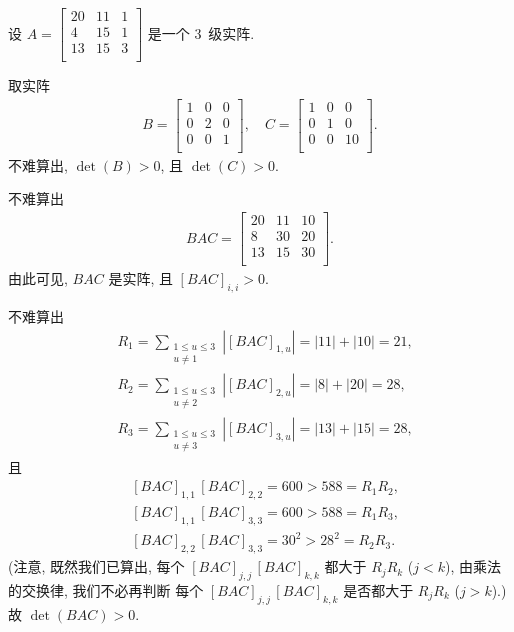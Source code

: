 \documentclass[../libro.tex]{subfiles}
\begin{document}
\begin{example}[continues=emp:NonzeroDet2]
    设 \(A =
        \begin{bmatrix}
            20 & 11 & 1 \\
            4  & 15 & 1 \\
            13 & 15 & 3 \\
    \end{bmatrix}\)
    是一个 \(3\)~级实阵.

    取实阵
    \begin{align*}
        B =
        \begin{bmatrix}
            1 & 0 & 0 \\
            0 & 2 & 0 \\
            0 & 0 & 1 \\
        \end{bmatrix},
        \quad
        C =
        \begin{bmatrix}
            1 & 0 & 0  \\
            0 & 1 & 0  \\
            0 & 0 & 10 \\
        \end{bmatrix}.
    \end{align*}
    不难算出, \(\det {(B)} > 0\),
    且 \(\det {(C)} > 0\).

    不难算出
    \begin{align*}
        BAC =
        \begin{bmatrix}
            20 & 11 & 10 \\
            8  & 30 & 20 \\
            13 & 15 & 30 \\
        \end{bmatrix}.
    \end{align*}
    由此可见, \(BAC\) 是实阵, 且 \([BAC]_{i,i} > 0\).

    不难算出
    \begin{align*}
        & R_1 = \sum_{\substack{1 \leq u \leq 3 \\ u \neq 1}}
        {|[BAC]_{1,u}|} = |11| + |10| = 21, \\
        & R_2 = \sum_{\substack{1 \leq u \leq 3 \\ u \neq 2}}
        {|[BAC]_{2,u}|} = |8| + |20| = 28, \\
        & R_3 = \sum_{\substack{1 \leq u \leq 3 \\ u \neq 3}}
        {|[BAC]_{3,u}|} = |13| + |15| = 28,
    \end{align*}
    且
    \begin{align*}
        & [BAC]_{1,1}\,[BAC]_{2,2}
        = 600 > 588 = R_1 R_2, \\
        & [BAC]_{1,1}\,[BAC]_{3,3}
        = 600 > 588 = R_1 R_3, \\
        & [BAC]_{2,2}\,[BAC]_{3,3}
        = 30^2 > 28^2 = R_2 R_3.
    \end{align*}
    (注意, 既然我们已算出, %
    每个 \([BAC]_{j,j}\,[BAC]_{k,k}\)
    都大于 \(R_j R_k\)
    (\(j < k\)),
    由乘法的交换律,
    我们不必再判断%
    每个 \([BAC]_{j,j}\,[BAC]_{k,k}\)
    是否都大于 \(R_j R_k\)
    (\(j > k\)).) %
    故 \(\det {(BAC)} > 0\).


\end{example}
\end{document}
